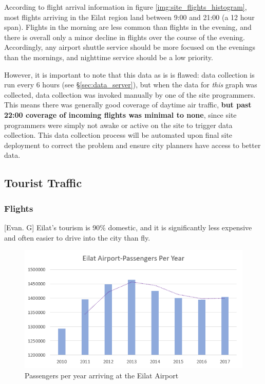 \documentclass[12pt]{article}                               %
\begin{document}
According to flight arrival information in figure \ref{img:site_flights_histogram}, most flights arriving in the Eilat region land between 9:00 and 21:00 (a 12 hour span). Flights in the morning are less common than flights in the evening, and there is overall only a minor decline in flights over the course of the evening. Accordingly, any airport shuttle service should be more focused on the evenings than the mornings, and nighttime service should be a low priority.

However, it is important to note that this data as is is flawed: data collection is run every 6 hours (see \S\ref{sec:data_server}), but when the data for \textit{this} graph was collected, data collection was invoked manually by one of the site programmers. This means there was generally good coverage of daytime air traffic, \textbf{but past 22:00 coverage of incoming flights was minimal to none}, since site programmers were simply not awake or active on the site to trigger data collection. This data collection process will be automated upon final site deployment to correct the problem and ensure city planners have access to better data.

\subsection{Tourist Traffic}
\subsubsection{Flights}[Evan. G]
Eilat's tourism is 90\% domestic, and it is significantly less expensive and often easier to drive into the city than fly. 
\begin{figure}[H]
    \centering
    \includegraphics[width=1\columnwidth]{images/passengers_per_year.png}
    \caption{Passengers per year arriving at the Eilat Airport}
    \label{img:passengers_per_year}
\end{figure}
\end{document}
